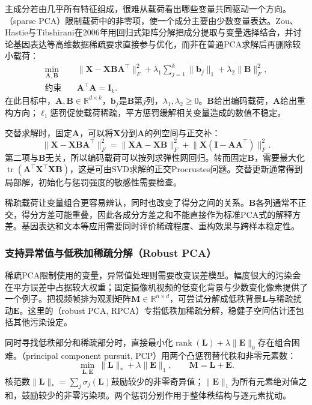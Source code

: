 主成分若由几乎所有特征组成，很难从载荷看出哪些变量共同驱动一个方向。（sparse PCA）限制载荷中的非零项，使一个成分主要由少数变量表达。Zou、Hastie与Tibshirani在2006年用回归式矩阵分解把成分提取与变量选择结合，并讨论基因表达等高维数据稀疏要求直接参与优化，而非在普通PCA求解后再删除较小载荷：
\begin{equation}
  \begin{aligned}
  \min_{\bm{A},\bm{B}}\quad&
    \lVert\bm{X}-\bm{X}\bm{B}\bm{A}^{\top}\rVert_F^2
    +\lambda_1\sum_{j=1}^{k}\lVert\bm{b}_j\rVert_1
    +\lambda_2\lVert\bm{B}\rVert_F^2,\\
  \text{约束}\quad&\bm{A}^{\top}\bm{A}=\bm{I}_k.
  \end{aligned}
  \label{eq:dim-sparse-pca}
\end{equation}
在此目标中，$\bm{A},\bm{B}\in\mathbb{R}^{d\times k}$，$\bm{b}_j$是$\bm{B}$第$j$列，$\lambda_1,\lambda_2\geq0$。$\bm{B}$给出编码载荷，$\bm{A}$给出重构方向；$\ell_1$惩罚促使载荷稀疏，平方惩罚缓解相关变量造成的数值不稳定。

交替求解时，固定$\bm{A}$，可以将$\bm{X}$分到$\bm{A}$的列空间与正交补：
\[
  \lVert\bm{X}-\bm{X}\bm{B}\bm{A}^{\top}\rVert_F^2
  =\lVert\bm{X}\bm{A}-\bm{X}\bm{B}\rVert_F^2
   +\lVert\bm{X}(\bm{I}-\bm{A}\bm{A}^{\top})\rVert_F^2.
\]
第二项与$\bm{B}$无关，所以编码载荷可以按列求弹性网回归。转而固定$\bm{B}$，需要最大化$\operatorname{tr}(\bm{A}^{\top}\bm{X}^{\top}\bm{X}\bm{B})$，这是可由SVD求解的正交Procrustes问题。交替更新通常得到局部解，初始化与惩罚强度的敏感性需要检查。

稀疏载荷让变量组合更容易辨认，同时也改变了得分之间的关系。$\bm{B}$各列通常不正交，得分方差可能重叠，因此各成分方差之和不能直接作为标准PCA式的解释方差。基因表达和文本等应用需要同时评价稀疏程度、重构效果与跨样本稳定性。

\subsubsection{支持异常值与低秩加稀疏分解（Robust PCA）}
\label{sec:dim-robust-pca}

稀疏PCA限制使用的变量，异常值处理则需要改变误差模型。幅度很大的污染会在平方误差中占据较大权重；固定摄像机视频的低变化背景与少数变化像素提供了一个例子。把视频帧排为观测矩阵$\bm{M}\in\mathbb{R}^{n\times d}$，可尝试分解成低秩背景$\bm{L}$与稀疏扰动$\bm{E}$。这里的（robust PCA, RPCA）专指低秩加稀疏分解，稳健子空间估计还包括其他污染设定。

同时寻找低秩部分和稀疏部分时，直接最小化$\operatorname{rank}(\bm{L})+\lambda\lVert\bm{E}\rVert_0$存在组合困难。（principal component pursuit, PCP）用两个凸惩罚替代秩和非零元素数：
\begin{equation}
  \min_{\bm{L},\bm{E}}\
     \lVert\bm{L}\rVert_*+\lambda\lVert\bm{E}\rVert_1,
  \qquad \bm{M}=\bm{L}+\bm{E}.
  \label{eq:dim-pcp}
\end{equation}
核范数$\lVert\bm{L}\rVert_*=\sum_j\sigma_j(\bm{L})$鼓励较少的非零奇异值；$\lVert\bm{E}\rVert_1$为所有元素绝对值之和，鼓励较少的非零污染项。两个惩罚分别作用于整体秩结构与逐元素扰动。

